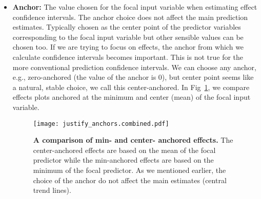 \begin{itemize}
\item \textbf{Anchor:} The value chosen for the focal input variable when estimating effect confidence intervals. The anchor choice does not affect the main prediction estimates. Typically chosen as the center point of the predictor variables corresponding to the focal input variable but other sensible values can be chosen too. If we are trying to focus on effects, the anchor from which we calculate confidence intervals becomes important. This is not true for the more conventional prediction confidence intervals. We can choose any anchor, e.g., zero-anchored (the value of the anchor is $0$), but center point seems like a natural, stable choice, we call this center-anchored. In Fig~\ref{fig:justify_anchors}, we compare effects plots anchored at the minimum and center (mean) of the focal input variable.
%
\begin{figure}
\begin{center}
\texttt{[image: justify\_anchors.combined.pdf]}
\end{center}
\caption{{\bf A comparison of min- and center- anchored effects.} The center-anchored effects are based on the mean of the focal predictor while the min-anchored effects are based on the minimum of the focal predictor. As we mentioned earlier, the choice of the anchor do not affect the main estimates (central trend lines). } 
\label{fig:justify_anchors}
\end{figure}
%

\end{itemize}
